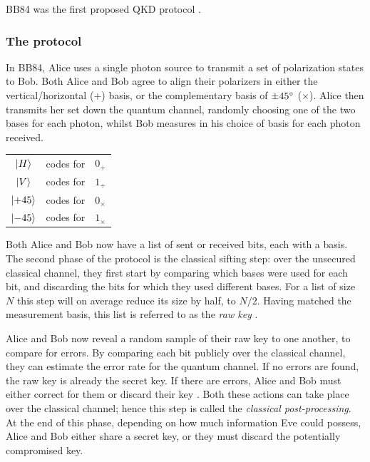 \documentclass[paper=a4, fontsize=11pt]{scrartcl} %
\numberwithin{equation}{section} %
\numberwithin{figure}{section} %
\numberwithin{table}{section} %
\begin{document}
BB84 was the first proposed QKD protocol \citep{BB84, historyBrassard}.

\subsubsection*{The protocol}
In BB84, Alice uses a single photon source to transmit a set of polarization states to Bob.
Both Alice and Bob agree to align
their polarizers in either the vertical/horizontal ($+$) basis, or the
complementary basis of $\pm 45 \degree$  ($\times$). Alice then transmits her set
down the quantum channel, randomly choosing one of the two bases for each
photon, whilst Bob measures in his choice of basis for each photon received.

\begin{center}
\begin{tabular}{c c c}
	$\ket{H}$  & codes for & $0_+$ \\
	$\ket{V}$  & codes for & $1_+$ \\
	$\ket{+45}$  & codes for & $0_\times$ \\
	$\ket{-45}$  & codes for & $1_\times$ \\
\end{tabular}
\end{center}

Both Alice and Bob now have a list of sent or received bits, each with a basis. The second
phase of the protocol is the classical sifting step: over the unsecured classical channel, they
first start by comparing which bases were used for each bit, and discarding the bits for which
they used different bases. For a list of size $N$ this step will on average reduce its size by half,
to $N/2$. Having matched the measurement basis, this list is referred to as the \textit{raw key} \citep{gisin2002}.

Alice and Bob now reveal a random sample of their raw key to one another, to compare for errors. By
comparing each bit publicly over the classical channel, they can estimate the error rate for
the quantum channel. If no errors are found, the raw key is already the secret key. If there are
errors, Alice and Bob must either correct for them or discard their key \citep{reviewScariani}. Both these actions can
take place over the classical channel; hence this step is called the \textit{classical post-processing}.
At the end of this phase, depending on how much information Eve could possess, Alice and Bob either share
a secret key, or they must discard the potentially compromised key.
\end{document}
